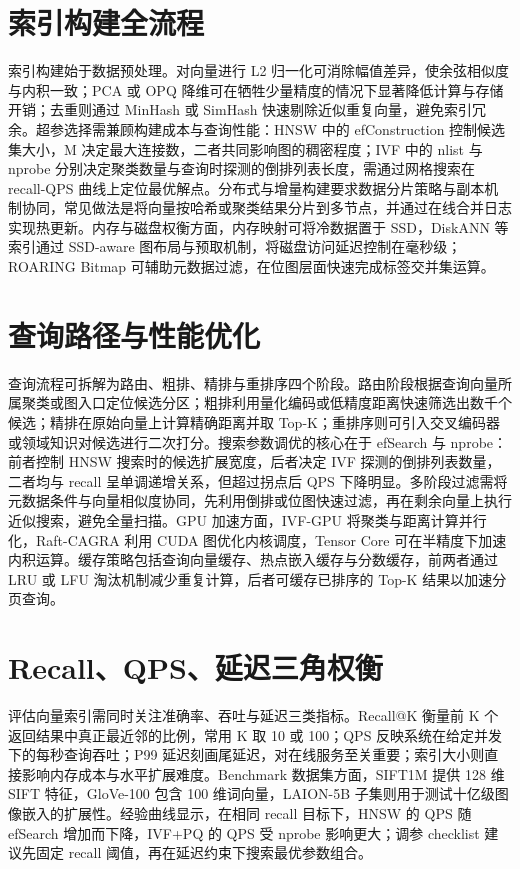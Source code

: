 \chapter{索引构建全流程}
索引构建始于数据预处理。对向量进行 L2 归一化可消除幅值差异，使余弦相似度与内积一致；PCA 或 OPQ 降维可在牺牲少量精度的情况下显著降低计算与存储开销；去重则通过 MinHash 或 SimHash 快速剔除近似重复向量，避免索引冗余。超参选择需兼顾构建成本与查询性能：HNSW 中的 efConstruction 控制候选集大小，M 决定最大连接数，二者共同影响图的稠密程度；IVF 中的 nlist 与 nprobe 分别决定聚类数量与查询时探测的倒排列表长度，需通过网格搜索在 recall-QPS 曲线上定位最优解点。分布式与增量构建要求数据分片策略与副本机制协同，常见做法是将向量按哈希或聚类结果分片到多节点，并通过在线合并日志实现热更新。内存与磁盘权衡方面，内存映射可将冷数据置于 SSD，DiskANN 等索引通过 SSD-aware 图布局与预取机制，将磁盘访问延迟控制在毫秒级；ROARING Bitmap 可辅助元数据过滤，在位图层面快速完成标签交并集运算。\par
\chapter{查询路径与性能优化}
查询流程可拆解为路由、粗排、精排与重排序四个阶段。路由阶段根据查询向量所属聚类或图入口定位候选分区；粗排利用量化编码或低精度距离快速筛选出数千个候选；精排在原始向量上计算精确距离并取 Top-K；重排序则可引入交叉编码器或领域知识对候选进行二次打分。搜索参数调优的核心在于 efSearch 与 nprobe：前者控制 HNSW 搜索时的候选扩展宽度，后者决定 IVF 探测的倒排列表数量，二者均与 recall 呈单调递增关系，但超过拐点后 QPS 下降明显。多阶段过滤需将元数据条件与向量相似度协同，先利用倒排或位图快速过滤，再在剩余向量上执行近似搜索，避免全量扫描。GPU 加速方面，IVF-GPU 将聚类与距离计算并行化，Raft-CAGRA 利用 CUDA 图优化内核调度，Tensor Core 可在半精度下加速内积运算。缓存策略包括查询向量缓存、热点嵌入缓存与分数缓存，前两者通过 LRU 或 LFU 淘汰机制减少重复计算，后者可缓存已排序的 Top-K 结果以加速分页查询。\par
\chapter{Recall、QPS、延迟三角权衡}
评估向量索引需同时关注准确率、吞吐与延迟三类指标。Recall@K 衡量前 K 个返回结果中真正最近邻的比例，常用 K 取 10 或 100；QPS 反映系统在给定并发下的每秒查询吞吐；P99 延迟刻画尾延迟，对在线服务至关重要；索引大小则直接影响内存成本与水平扩展难度。Benchmark 数据集方面，SIFT1M 提供 128 维 SIFT 特征，GloVe-100 包含 100 维词向量，LAION-5B 子集则用于测试十亿级图像嵌入的扩展性。经验曲线显示，在相同 recall 目标下，HNSW 的 QPS 随 efSearch 增加而下降，IVF+PQ 的 QPS 受 nprobe 影响更大；调参 checklist 建议先固定 recall 阈值，再在延迟约束下搜索最优参数组合。\par
